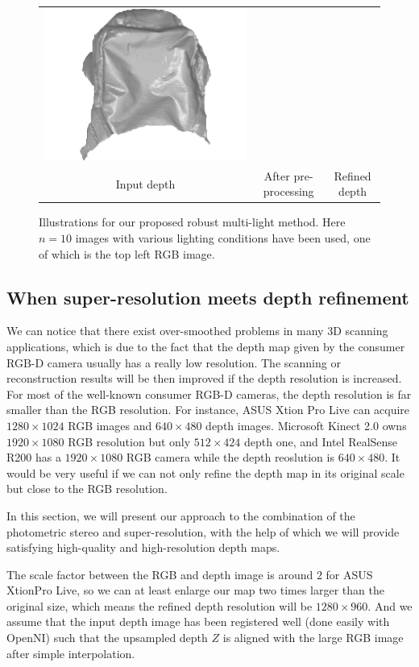 \begin{figure}[!ht]
{\begin{tabular}{c| c c}
   \includegraphics[height = 0.25\linewidth]{figures/methodology/robust_backpack_shape.pdf}\\
{Input depth} & {After pre-processing} & {Refined depth}
 \end{tabular}}
\caption{Illustrations for our proposed robust multi-light method. Here $n = 10$ images with various lighting conditions have been used, one of which is the top left RGB image. }
\label{fig:robust_illustration}
\end{figure}




\subsection{When super-resolution meets depth refinement}
We can notice that there exist over-smoothed problems in many 3D scanning applications, which is due to the fact that the depth map given by the consumer RGB-D camera usually has a really low resolution.
The scanning or reconstruction results will be then improved if the depth resolution is increased.
For most of the well-known consumer RGB-D cameras, the depth resolution is far smaller than the RGB resolution.
For instance, ASUS Xtion Pro Live can acquire $1280\times 1024$ RGB images and $640\times 480$ depth images. Microsoft Kinect 2.0 owns $1920\times1080$ RGB resolution but only $512\times424$ depth one, and Intel RealSense R200 has a $1920\times1080$ RGB camera while the depth reoslution is $640\times 480$.
It would be very useful if we can not only refine the depth map in its original scale but close to the RGB resolution.  

In this section, we will present our approach to the combination of the photometric stereo and super-resolution, with the help of which we will provide satisfying high-quality and high-resolution depth maps. 

The scale factor between the RGB and depth image is around $2$ for ASUS XtionPro Live, so we can at least enlarge our map two times larger than the original size, which means the refined depth resolution will be $1280\times960$.
 And we assume that the input depth image has been registered well (done easily with OpenNI) such that the upsampled depth $Z$ is aligned with the large RGB image after simple interpolation.


